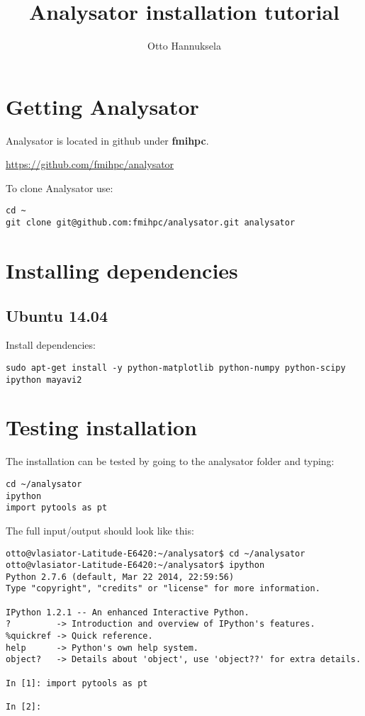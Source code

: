 \documentclass[a4paper,10pt]{article}
\title{Analysator installation tutorial}
\author{Otto Hannuksela}
\begin{document}
\maketitle

\section{Getting Analysator} 

Analysator is located in github under \textbf{fmihpc}.

\url{https://github.com/fmihpc/analysator}

To clone Analysator use:

\begin{verbatim}
cd ~
git clone git@github.com:fmihpc/analysator.git analysator
\end{verbatim}


\section{Installing dependencies}

\subsection{Ubuntu 14.04}

Install dependencies:

\begin{verbatim}
sudo apt-get install -y python-matplotlib python-numpy python-scipy ipython mayavi2
\end{verbatim}

\section{Testing installation}

The installation can be tested by going to the analysator folder and typing:

\begin{verbatim}
cd ~/analysator
ipython
import pytools as pt
\end{verbatim}

The full input/output should look like this:
\begin{verbatim}
otto@vlasiator-Latitude-E6420:~/analysator$ cd ~/analysator
otto@vlasiator-Latitude-E6420:~/analysator$ ipython
Python 2.7.6 (default, Mar 22 2014, 22:59:56) 
Type "copyright", "credits" or "license" for more information.

IPython 1.2.1 -- An enhanced Interactive Python.
?         -> Introduction and overview of IPython's features.
%quickref -> Quick reference.
help      -> Python's own help system.
object?   -> Details about 'object', use 'object??' for extra details.

In [1]: import pytools as pt

In [2]: 

\end{verbatim}
\end{document}
